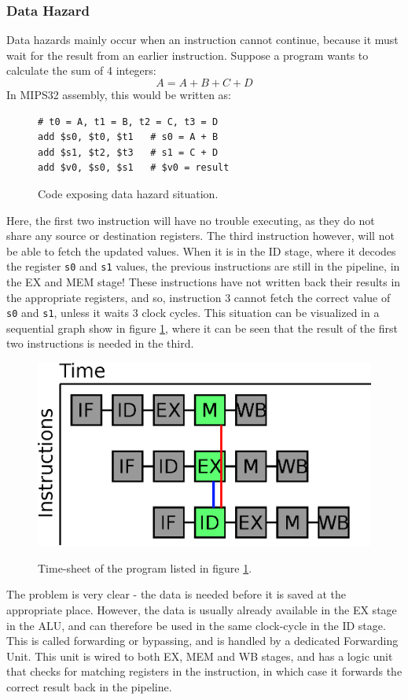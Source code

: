 \subsubsection{Data Hazard}
Data hazards mainly occur when an instruction cannot continue, because it must
wait for the result from an earlier instruction. Suppose a program wants to
calculate the sum of 4 integers:
$$A = A + B + C + D$$
In MIPS32 assembly, this would be written as:
\begin{figure}[H]
	\centering
	\begin{lstlisting}
# t0 = A, t1 = B, t2 = C, t3 = D
add $s0, $t0, $t1 	# s0 = A + B
add $s1, $t2, $t3	# s1 = C + D
add $v0, $s0, $s1	# $v0 = result
	\end{lstlisting}
	\caption{Code exposing data hazard situation.}
	\label{fig:data_hazard_code}
\end{figure}
Here, the first two instruction will have no trouble executing, as they do not
share any source or destination registers. The third instruction however, will
not be able to fetch the updated values. When it is in the ID stage, where it decodes the
register \texttt{s0} and \texttt{s1} values, the previous instructions are
still in the pipeline, in the EX and MEM stage! These instructions have not
written back their results in the appropriate registers, and so, instruction 3
cannot fetch the correct value of \texttt{s0} and \texttt{s1}, unless it waits 3 clock
cycles. This situation can be visualized in a sequential graph show in figure
\ref{fig:data_hazard_code}, where it can be seen that the result of the first
two instructions is needed in the third.\\
\begin{figure}[H]
	\centering
	\includegraphics[scale=0.4]{pipeline/data_hazard.eps}
	\label{fig:data_hazard}
	\caption{Time-sheet of the program listed in figure
\ref{fig:data_hazard_code}.}
\end{figure}
The problem is very clear - the data is needed before it is saved at the
appropriate place. However, the data is usually already available in the EX
stage in the ALU, and can therefore be used in the same clock-cycle in the ID
stage. This is called forwarding or bypassing, and is handled by a dedicated
Forwarding Unit. This unit is wired to both EX, MEM and WB stages, and has a
logic unit that checks for matching registers in the instruction, in which case
it forwards the correct result back in the pipeline.


